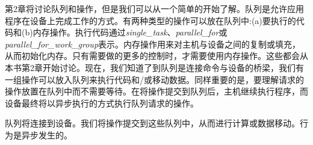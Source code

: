 第2章将讨论队列和操作，但是我们可以从一个简单的开始了解。队列是允许应用程序在设备上完成工作的方式。有两种类型的操作可以放在队列中:(a)要执行的代码和(b)内存操作。执行代码通过\textit{single\_task}、\textit{parallel\_for}或\textit{parallel\_for\_work\_group}表示。内存操作用来对主机与设备之间的复制或填充，从而初始化内存。只有需要做的更多的控制时，才需要使用内存操作。这些都会从本书第2章开始讨论。现在，我们知道了到队列是连接命令与设备的桥梁，我们有一组操作可以放入队列来执行代码和/或移动数据。同样重要的是，要理解请求的操作放置在队列中而不需要等待。在将操作提交到队列后，主机继续执行程序，而设备最终将以异步执行的方式执行队列请求的操作。\par

\begin{tcolorbox}[colback=red!5!white,colframe=red!75!black]
队列将连接到设备。我们将操作提交到这些队列中，从而进行计算或数据移动。行为是异步发生的。
\end{tcolorbox}
